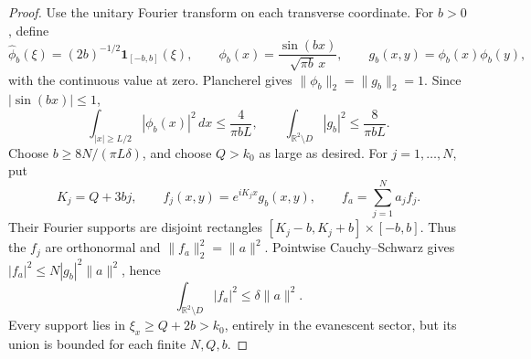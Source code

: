 \begin{proof}
Use the unitary Fourier transform on each transverse coordinate.  For
$b>0$, define
\begin{equation}
 \widehat\phi_b(\xi)=(2b)^{-1/2}\mathbf1_{[-b,b]}(\xi),\qquad
 \phi_b(x)=\frac{\sin(bx)}{\sqrt{\pi b}\,x},\qquad
 g_b(x,y)=\phi_b(x)\phi_b(y),
 \label{ca:sinc}
\end{equation}
with the continuous value at zero.  Plancherel gives
$\|\phi_b\|_2=\|g_b\|_2=1$.  Since $|\sin(bx)|\leq1$,
\begin{equation}
 \int_{|x|\geq L/2}|\phi_b(x)|^2\,dx\leq\frac4{\pi bL},
 \qquad
 \int_{\mathbb R^2\setminus D}|g_b|^2\leq\frac8{\pi bL}.
 \label{ca:sincescape}
\end{equation}
Choose $b\geq8N/(\pi L\delta)$, and choose $Q>k_0$ as large as
desired.  For $j=1,\ldots,N$, put
\begin{equation}
 K_j=Q+3bj,\qquad f_j(x,y)=e^{iK_jx}g_b(x,y),\qquad
 f_a=\sum_{j=1}^Na_jf_j.
 \label{ca:packets}
\end{equation}
Their Fourier supports are disjoint rectangles
$[K_j-b,K_j+b]\times[-b,b]$.  Thus the $f_j$ are orthonormal and
$\|f_a\|_2^2=\|a\|^2$.  Pointwise Cauchy--Schwarz gives
$|f_a|^2\leq N|g_b|^2\|a\|^2$, hence
\begin{equation}
 \int_{\mathbb R^2\setminus D}|f_a|^2\leq\delta\|a\|^2.
 \label{ca:packettail}
\end{equation}
Every support lies in $\xi_x\geq Q+2b>k_0$, entirely in the
evanescent sector, but its union is bounded for each finite $N,Q,b$.


\end{proof}
